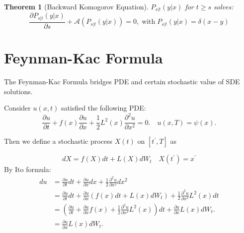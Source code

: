 \documentclass{article}
\newtheorem{theorem}{Theorem}
\begin{document}
\begin{theorem}[Backward Komogorov Equation]
    $P_{s|t}(y|x)$ for $t\geq s$ solves:
    \begin{equation}
        \frac{\partial P_{s|t}(y|x)}{\partial s} + \mathcal{A}(P_{s|t}(y|x))=0, \operatorname{ with }P_{s|t}(y|x) = \delta(x-y)
    \end{equation}
\end{theorem}


\section{Feynman-Kac Formula}
The Feynman-Kac Formula bridges PDE and certain stochastic value of SDE solutions.

Consider $u(x, t)$ satisfied the following PDE:
\begin{equation}
    \frac{\partial u}{\partial t}+f(x) \frac{\partial u}{\partial x}+\frac{1}{2} L^{2}(x) \frac{\partial^{2} u}{\partial x^{2}}=0 . \quad u(x, T)=\psi(x) .
\end{equation}

Then we define a stochastic process $X(t)$  on  $\left[t^{\prime}, T\right]$  as

\begin{equation}
    d X=f(X) d t+L(X) d W_{t} \quad X\left(t^{\prime}\right)=x^{\prime}
\end{equation}
By Ito formula:
\begin{equation}
    \begin{aligned}
    d u & =\frac{\partial u}{\partial t} d t+\frac{\partial u}{\partial x} d x+\frac{1}{2} \frac{\partial^{2} u}{\partial x^{2}} d x^{2} \\
    & =\frac{\partial u}{\partial t} d t+\frac{\partial u}{\partial x}\left(f(x) d t+L(x) d W_{t}\right)+\frac{1}{2} \frac{\partial^{2} u}{\partial x^{2}} L^{2}(x) d t \\
    & =\left(\frac{\partial u}{\partial t}+\frac{\partial u}{\partial x} f(x)+\frac{1}{2} \frac{\partial^{2} u}{\partial x^{2}} L^{2}(x)\right) d t+\frac{\partial u}{\partial x} L(x) d W_{t} . \\
    & =\frac{\partial u}{\partial x} L(x) d W_{t} .
    \end{aligned}
\end{equation}
\end{document}
